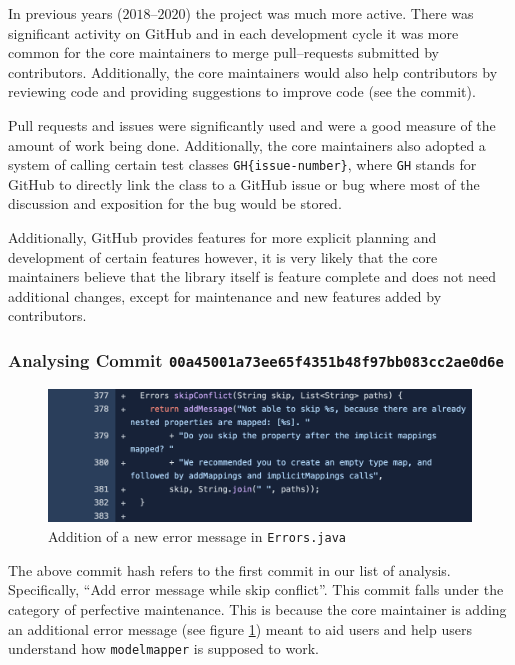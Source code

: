 \documentclass[12pt]{article}
\newcommand{\modelmapper}{\texttt{modelmapper}\xspace}
\begin{document}
In previous years ($2018$--$2020$) the project was much more
active. There was significant activity on GitHub and in each
development cycle it was more common for the core maintainers to
merge pull--requests submitted by contributors. Additionally,
the core maintainers would also help contributors by reviewing
code and providing suggestions to improve code (see the 
commit).

Pull requests and issues were significantly used and were a
good measure of the amount of work being done. Additionally, the
core maintainers also adopted a system of calling certain test
classes \verb|GH{issue-number}|, where \texttt{GH} stands for
GitHub to directly link the class to a GitHub issue or bug
where most of the discussion and exposition for the bug would be
stored.

Additionally, GitHub provides features for more explicit planning
and development of certain features however, it is very likely
that the core maintainers believe that the library itself is
feature complete and does not need additional changes, except
for maintenance and new features added by contributors.

\subsubsection{Analysing Commit
\texttt{00a45001a73ee65f4351b48f97bb083cc2ae0d6e}}

\begin{figure}[H]
    \centering
    \includegraphics[width=14cm]{images/code-diff.png}
    \caption{Addition of a new error message in
    \texttt{Errors.java}}
    \label{error-message}
\end{figure}

The above commit hash refers to the first commit in our list of
analysis. Specifically, ``Add error message while skip
conflict''. This commit falls under the category of perfective
maintenance. This is because the core maintainer is adding an
additional error message (see figure \ref{error-message}) meant
to aid users and help users understand how \modelmapper is
supposed to work.
\end{document}
